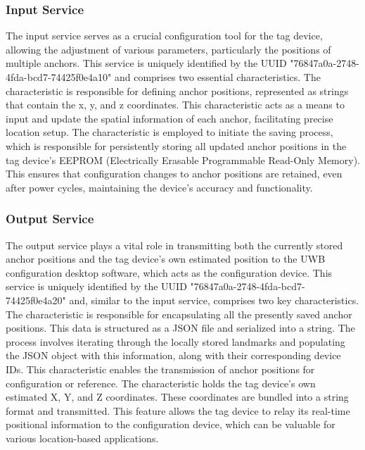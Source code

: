 \subsubsection{Input Service}
\label{subsub:Input_Service}
The input service serves as a crucial configuration tool for the tag device, allowing the adjustment of various parameters, particularly the positions of multiple anchors. This service is uniquely identified by the UUID "76847a0a-2748-4fda-bcd7-74425f0e4a10" and comprises two essential characteristics.
\vspace{4pt}
\newline
The  characteristic is responsible for defining anchor positions, represented as strings that contain the x, y, and z coordinates. This characteristic acts as a means to input and update the spatial information of each anchor, facilitating precise location setup.
\vspace{4pt}
\newline
The  characteristic is employed to initiate the saving process, which is responsible for persistently storing all updated anchor positions in the tag device's EEPROM (Electrically Erasable Programmable Read-Only Memory). This ensures that configuration changes to anchor positions are retained, even after power cycles, maintaining the device's accuracy and functionality.

\subsubsection{Output Service}
\label{subsub:Output_Service}
The output service plays a vital role in transmitting both the currently stored anchor positions and the tag device's own estimated position to the UWB configuration desktop software, which acts as the configuration device. This service is uniquely identified by the UUID "76847a0a-2748-4fda-bcd7-74425f0e4a20" and, similar to the input service, comprises two key characteristics.
\vspace{4pt}
\newline
The  characteristic is responsible for encapsulating all the presently saved anchor positions. This data is structured as a JSON file and serialized into a string. The process involves iterating through the locally stored landmarks and populating the JSON object with this information, along with their corresponding device IDs. This characteristic enables the transmission of anchor positions for configuration or reference.
\vspace{4pt}
\newline
The  characteristic holds the tag device's own estimated X, Y, and Z coordinates. These coordinates are bundled into a string format and transmitted. This feature allows the tag device to relay its real-time positional information to the configuration device, which can be valuable for various location-based applications.

